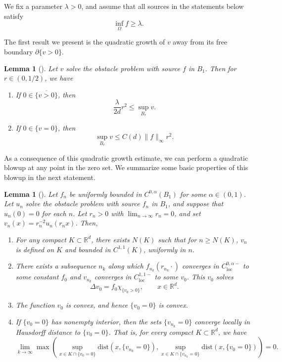 \documentclass[11pt]{amsart}
\numberwithin{equation}{section}
\numberwithin{figure}{section}
\theoremstyle{plain}
\newtheorem{lem}[thm]{Lemma}
\theoremstyle{definition}
\theoremstyle{remark}
\theoremstyle{plain}
\def\R{\mathbb{R}}
\begin{document}
We fix a parameter $\lambda > 0$, and assume that all sources in the statements below satisfy
\begin{equation}
    \inf_{\Omega} f \geq \lambda.
\end{equation}

The first result we present is the quadratic growth of $v$ away from its free boundary $\partial\{ v > 0\}$.

\begin{lem}[{\cite[Theorems 2.1 and 2.4]{blank}}]\label{obst-quadratic-growth}
    Let $v$ solve the obstacle problem with source $f$ in $B_1$. Then for $r\in (0,1/2)$, we have
    \begin{enumerate}[label=(\roman*)]
        \item\label{item:obst-nondegeneracy} If $0\in \overline{\{ v > 0\}}$, then
        \[ \frac{\lambda}{2d}r^2 \leq \sup_{B_r} v. \]
        \item\label{item:obst-growth-bd} If $0\in \{ v= 0\}$, then
        \[ \sup_{B_r} v \leq C(d)\|f\|_\infty r^2. \]
    \end{enumerate}
\end{lem}

As a consequence of this quadratic growth estimate, we can perform a quadratic blowup at any point in the zero set. We summarize some basic properties of this blowup in the next statement.

\begin{lem}[{\cite[Theorem 2, Corollary 7, Lemma 12a]{Caffarelli98}}]\label{lem:obst-blowup}
Let $f_n$ be uniformly bounded in $C^{0,\alpha}(B_1)$ for some $\alpha\in (0,1)$. Let $u_n$ solve the obstacle problem with source $f_n$ in $B_1$, and suppose that $u_n(0) = 0$ for each $n$. Let $r_n > 0$ with $\lim_{n\to\infty}r_n = 0$, and set $v_n(x) = r_n^{-2}u_n(r_n x)$. Then,
\begin{enumerate}[label=(\roman*)]
    \item\label{item:obst-precompact} For any compact $K\subset \R^d$, there exists $N(K)$ such that for $n \geq N(K)$, $v_n$ is defined on $K$ and bounded in $C^{1,1}(K)$, uniformly in $n$.
    \item\label{item:obst-converges} There exists a subsequence $n_k$ along which $f_{n_k}(r_{n_k}\cdot)$ converges in $C^{0,\alpha-}_{\mathrm{loc}}$ to some constant $f_0$ and $v_{n_k}$ converges in $C^{1,1-}_{\mathrm{loc}}$ to some $v_0$. This $v_0$ solves
    \[ \Delta v_0 = f_0\chi_{\{v_0 > 0\}}, \qquad x\in \R^d. \]
    \item\label{item:obst-global-convex}The function $v_0$ is convex, and hence $\{ v_0 = 0\}$ is convex.
    \item\label{item:obst-hausdorff-dist} If $\{ v_0 = 0\}$ has nonempty interior, then the sets $\{ v_{n_k} = 0\}$ converge locally in Hausdorff distance to $\{ v_0 = 0\}$. That is, for every compact $K\subset \R^d$, we have
    \[ \lim_{k\to\infty}\max\left(\sup_{x\in K\cap \{ v_0 = 0\}} \mathrm{dist}(x, \{ v_{n_k} = 0\}), \sup_{x\in K\cap \{ v_{n_k} = 0\}} \mathrm{dist}(x, \{ v_0 = 0\}) \right) = 0. \]
\end{enumerate}
\end{lem}
\end{document}
